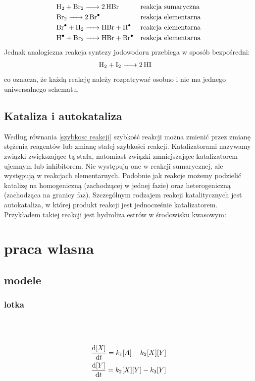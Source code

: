 \documentclass[10pt, a4paper, twoside, onecolumn]{article}
\numberwithin{equation}{section}
\begin{document}
	\begin{align*}
		&\ce{H2 + Br2 -> 2HBr} &&\text{reakcja sumaryczna} \\
		&\ce{Br2 -> 2Br^{.}} &&\text{reakcja elementarna} \\
		&\ce{Br^{.} + H2 -> HBr + H^{.}} &&\text{reakcja elementarna} \\
		&\ce{H^{.} + Br2 -> HBr + Br^{.}} &&\text{reakcja elementarna}
	\end{align*}
	Jednak analogiczna reakcja syntezy jodowodoru przebiega w sposób bezpośredni: 
	\begin{align*}
		&\ce{H2 + I2 -> 2HI}
	\end{align*}
	co oznacza, że każdą reakcję należy rozpatrywać osobno i nie ma jednego uniwersalnego schematu. \cite{pigon1}
	
	\subsection{Kataliza i autokataliza}
	Według równania \eqref{szybkosc reakcji} szybkość reakcji można zmienić przez zmianę stężenia reagentów lub zmianę stałej szybkości reakcji. Katalizatorami nazywamy związki zwiększające tą stała, natomiast związki zmniejszające katalizatorem ujemnym lub inhibitorem. Nie występują one w reakcji sumarycznej, ale występują w reakcjach elementarnych. Podobnie jak reakcje możemy podzielić katalizę na homogeniczną (zachodzącej w jednej fazie) oraz heterogeniczną (zachodząca na granicy faz). Szczególnym rodzajem reakcji katalitycznych jest autokataliza, w której produkt reakcji jest jednocześnie katalizatorem. Przykładem takiej reakcji jest hydroliza estrów w środowisku kwasowym: \cite{pigon1}
	\begin{center}
	\end{center}
	
	\section{praca wlasna}
	\subsection{modele}
	\subsubsection{lotka}
	\begin{center}
		 \\
		 \\
	\end{center}
	\begin{gather}
		\dv{[X]}{t}=k_{1}[A]-k_{2}[X][Y] \\
		\dv{[Y]}{t}=k_{2}[X][Y]-k_{3}[Y]
	\end{gather}
\end{document}
